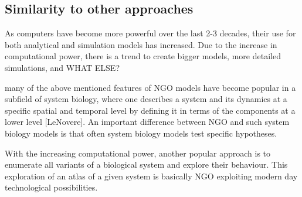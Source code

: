 \subsection{Similarity to other approaches}

As computers have become more powerful over the last 2-3 decades, their use for both analytical and simulation models has increased. Due to the increase in computational power, there is a trend to create bigger models, more detailed simulations, and WHAT ELSE? 

many of the above mentioned features of NGO models have become popular in a subfield of system biology, where one describes a system and its dynamics at a specific spatial and temporal level by defining it in terms of the components at a lower level [LeNovere]. An important difference between NGO and such system biology models is that often system biology models test specific hypotheses. 

With the increasing computational power, another popular approach is to enumerate all variants of a biological system and explore their behaviour. This exploration of an atlas of a given system is basically NGO exploiting modern day technological possibilities.

